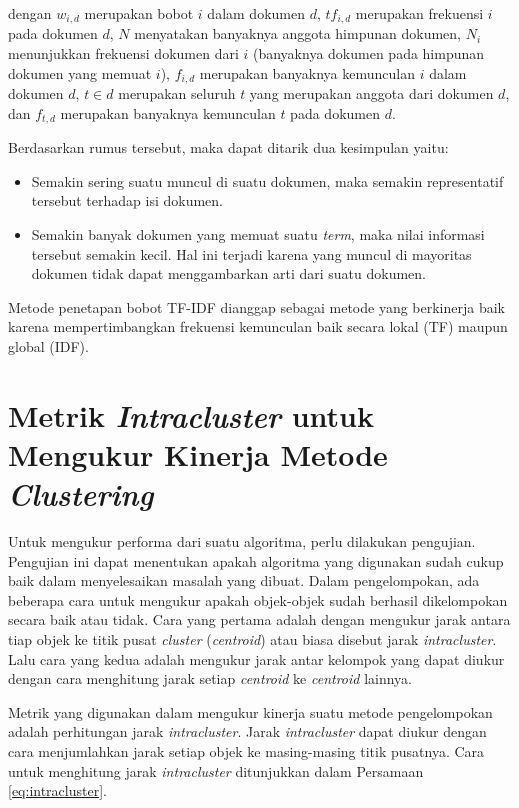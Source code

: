 dengan $w_{i,d}$ merupakan bobot \term $i$ dalam dokumen $d$, $tf_{i,d}$ merupakan frekuensi \term $i$ pada dokumen $d$, $N$ menyatakan banyaknya anggota himpunan dokumen, $N_i$ menunjukkan frekuensi dokumen dari \term $i$ (banyaknya dokumen pada himpunan dokumen yang memuat \term $i$), $f_{i,d}$ merupakan banyaknya kemunculan \term $i$ dalam dokumen $d$, $t \in d$ merupakan seluruh \term $t$ yang merupakan anggota dari dokumen $d$, dan $f_{t,d}$ merupakan banyaknya kemunculan \term $t$ pada dokumen $d$.

Berdasarkan rumus tersebut, maka dapat ditarik dua kesimpulan yaitu:
\begin{itemize}
	\item Semakin sering suatu \term muncul di suatu dokumen, maka semakin representatif \term tersebut terhadap isi dokumen.
	\item Semakin banyak dokumen yang memuat suatu \textit{term}, maka nilai informasi \term tersebut semakin kecil. Hal ini terjadi karena \term yang muncul di mayoritas dokumen tidak dapat menggambarkan arti dari suatu dokumen.
\end{itemize}

Metode penetapan bobot TF-IDF dianggap sebagai metode yang berkinerja baik karena mempertimbangkan frekuensi kemunculan \term baik secara lokal (TF) maupun global (IDF).

\section{Metrik \textit{Intracluster} untuk Mengukur Kinerja Metode \textit{Clustering}}
Untuk mengukur performa dari suatu algoritma, perlu dilakukan pengujian. Pengujian ini dapat menentukan apakah algoritma yang digunakan sudah cukup baik dalam menyelesaikan masalah yang dibuat. Dalam pengelompokan, ada beberapa cara untuk mengukur apakah objek-objek sudah berhasil dikelompokan secara baik atau tidak. Cara yang pertama adalah dengan mengukur jarak antara tiap objek ke titik pusat \textit{cluster} (\textit{centroid}) atau biasa disebut jarak \textit{intracluster}. Lalu cara yang kedua adalah mengukur jarak antar kelompok yang dapat diukur dengan cara menghitung jarak setiap \textit{centroid} ke \textit{centroid} lainnya.

Metrik yang digunakan \cite{maulik2000genetic} dalam mengukur kinerja suatu metode pengelompokan adalah perhitungan jarak \textit{intracluster}. Jarak \textit{intracluster} dapat diukur dengan cara menjumlahkan jarak setiap objek ke masing-masing titik pusatnya. Cara untuk menghitung jarak \textit{intracluster} ditunjukkan dalam Persamaan \ref{eq:intracluster}.

